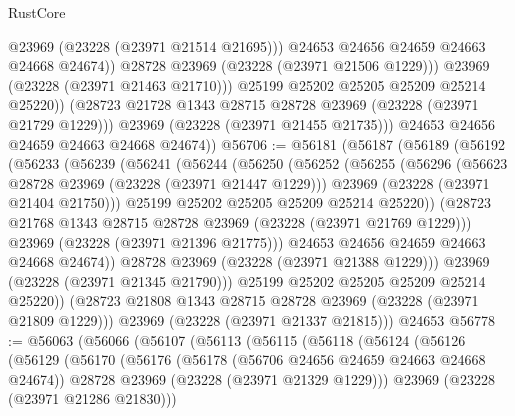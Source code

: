 \begin{lexlean}{RustCore}
\begin{coremodule}
                        @23969
                        (@23228 (@23971 @21514 @21695)))
                      @24653
                      @24656
                      @24659
                      @24663
                      @24668
                      @24674))
                  @28728
                  @23969
                  (@23228 (@23971 @21506 @1229)))
                @23969
                (@23228 (@23971 @21463 @21710)))
              @25199
              @25202
              @25205
              @25209
              @25214
              @25220))
          (@28723 @21728 @1343 @28715 @28728 @23969 (@23228 (@23971 @21729 @1229)))
          @23969
          (@23228 (@23971 @21455 @21735)))
        @24653
        @24656
        @24659
        @24663
        @24668
        @24674))
@56706 := @56181
    (@56187
      (@56189
        (@56192
          (@56233
            (@56239
              (@56241
                (@56244
                  (@56250
                    (@56252
                      (@56255
                        (@56296
                          (@56623 @28728 @23969 (@23228 (@23971 @21447 @1229)))
                          @23969
                          (@23228 (@23971 @21404 @21750)))
                        @25199
                        @25202
                        @25205
                        @25209
                        @25214
                        @25220))
                    (@28723 @21768 @1343 @28715 @28728 @23969 (@23228 (@23971 @21769 @1229)))
                    @23969
                    (@23228 (@23971 @21396 @21775)))
                  @24653
                  @24656
                  @24659
                  @24663
                  @24668
                  @24674))
              @28728
              @23969
              (@23228 (@23971 @21388 @1229)))
            @23969
            (@23228 (@23971 @21345 @21790)))
          @25199
          @25202
          @25205
          @25209
          @25214
          @25220))
      (@28723 @21808 @1343 @28715 @28728 @23969 (@23228 (@23971 @21809 @1229)))
      @23969
      (@23228 (@23971 @21337 @21815)))
    @24653
@56778 := @56063
    (@56066
      (@56107
        (@56113
          (@56115
            (@56118
              (@56124
                (@56126
                  (@56129
                    (@56170
                      (@56176
                        (@56178 (@56706 @24656 @24659 @24663 @24668 @24674))
                        @28728
                        @23969
                        (@23228 (@23971 @21329 @1229)))
                      @23969
                      (@23228 (@23971 @21286 @21830)))

\end{coremodule}
\end{lexlean}
